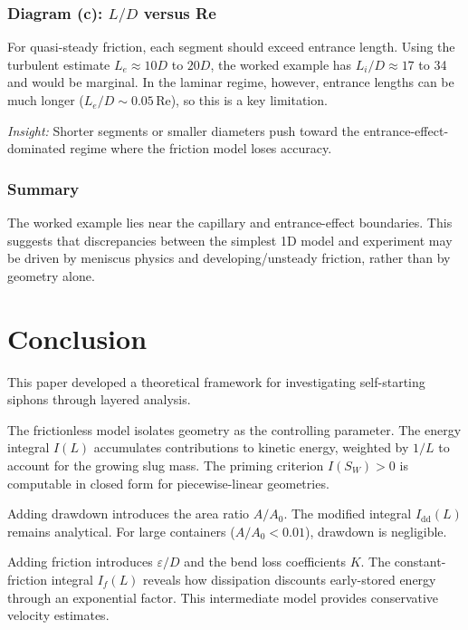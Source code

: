 \documentclass[11pt]{article}
\begin{document}
\subsubsection{Diagram (c): $L/D$ versus Re}

For quasi-steady friction, each segment should exceed entrance length. Using the turbulent estimate $L_e \approx 10D$ to $20D$, the worked example has $L_i/D \approx 17$ to 34 and would be marginal. In the laminar regime, however, entrance lengths can be much longer ($L_e/D \sim 0.05\,\text{Re}$), so this is a key limitation.

\emph{Insight:} Shorter segments or smaller diameters push toward the entrance-effect-dominated regime where the friction model loses accuracy.

\subsubsection{Summary}

The worked example lies near the capillary and entrance-effect boundaries. This suggests that discrepancies between the simplest 1D model and experiment may be driven by meniscus physics and developing/unsteady friction, rather than by geometry alone.

\section{Conclusion}
\label{sec:conclusion}

This paper developed a theoretical framework for investigating self-starting siphons through layered analysis.

The frictionless model isolates geometry as the controlling parameter. The energy integral $I(L)$ accumulates contributions to kinetic energy, weighted by $1/L$ to account for the growing slug mass. The priming criterion $I(S_W) > 0$ is computable in closed form for piecewise-linear geometries.

Adding drawdown introduces the area ratio $A/A_0$. The modified integral $I_{\text{dd}}(L)$ remains analytical. For large containers ($A/A_0 < 0.01$), drawdown is negligible.

Adding friction introduces $\varepsilon/D$ and the bend loss coefficients $K$. The constant-friction integral $I_f(L)$ reveals how dissipation discounts early-stored energy through an exponential factor. This intermediate model provides conservative velocity estimates.
\end{document}
